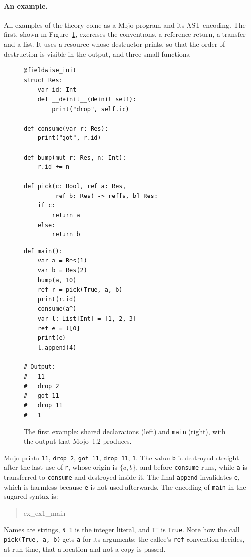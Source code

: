 \documentclass[11pt,a4paper]{article}
\newcommand{\usesnip}[1]{\csname #1\endcsname}
\newenvironment{snippet}{\begin{quote}\small}{\end{quote}}
\newcommand{\code}[1]{\texttt{#1}}
\begin{document}
\paragraph{An example.}
All examples of the theory come as a Mojo program and its AST encoding. The first,
shown in Figure~\ref{fig:ex1}, exercises the conventions, a reference return, a
transfer and a list. It uses a resource whose destructor prints, so that the
order of destruction is visible in the output, and three small functions.
\begin{figure}[t]
\centering
\begin{minipage}[t]{0.5\textwidth}
\begin{lstlisting}[basicstyle=\ttfamily\footnotesize]
@fieldwise_init
struct Res:
    var id: Int
    def __deinit__(deinit self):
        print("drop", self.id)

def consume(var r: Res):
    print("got", r.id)

def bump(mut r: Res, n: Int):
    r.id += n

def pick(c: Bool, ref a: Res,
         ref b: Res) -> ref[a, b] Res:
    if c:
        return a
    else:
        return b
\end{lstlisting}
\end{minipage}%
\begin{minipage}[t]{0.47\textwidth}
\begin{lstlisting}[basicstyle=\ttfamily\footnotesize]
def main():
    var a = Res(1)
    var b = Res(2)
    bump(a, 10)
    ref r = pick(True, a, b)
    print(r.id)
    consume(a^)
    var l: List[Int] = [1, 2, 3]
    ref e = l[0]
    print(e)
    l.append(4)

# Output:
#   11
#   drop 2
#   got 11
#   drop 11
#   1
\end{lstlisting}
\end{minipage}
\caption{The first example: shared declarations (left) and \code{main} (right), with the
output that Mojo~1.2 produces.}
\label{fig:ex1}
\end{figure}
Mojo prints \code{11}, \code{drop 2}, \code{got 11}, \code{drop 11}, \code{1}. The
value \code{b} is destroyed straight after the last use of \code{r}, whose origin
is $\{a,b\}$, and before \code{consume} runs, while \code{a} is transferred to
\code{consume} and destroyed inside it. The final \code{append} invalidates
\code{e}, which is harmless because \code{e} is not used afterwards. The encoding of
\code{main} in the sugared syntax is:
\begin{snippet}
\begin{isabelle}
\usesnip{ex_ex1_main}
\end{isabelle}
\end{snippet}
Names are strings, \code{N 1} is the integer literal, and \code{TT} is \code{True}.
Note how the call \code{pick(True, a, b)} gets \code{\isasymlangle\isasymsection a\isasymrangle}
for its arguments: the callee's \code{ref} convention decides, at run time, that a
location and not a copy is passed.
\end{document}

